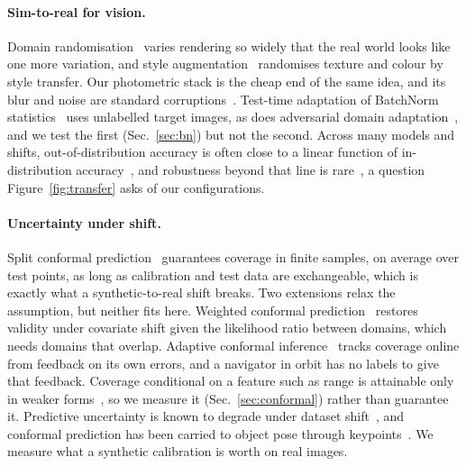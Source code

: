\documentclass{article}
\begin{document}
\paragraph{Sim-to-real for vision.} Domain
randomisation~\citep{tobin2017domainrand,tremblay2018training} varies rendering so widely that
the real world looks like one more variation, and style augmentation~\citep{jackson2019style}
randomises texture and colour by style transfer. Our photometric stack is the cheap end of
the same idea, and its blur and noise are standard corruptions~\citep{hendrycks2019benchmarking}.
Test-time adaptation of BatchNorm
statistics~\citep{li2018adabn,schneider2020improving,nado2020evaluating} uses unlabelled
target images, as does adversarial domain adaptation~\citep{ganin2016domain}, and we test the
first (Sec.~\ref{sec:bn}) but not the second. Across many models and shifts, out-of-distribution
accuracy is often close to a linear function of in-distribution
accuracy~\citep{miller2021accuracy}, and robustness beyond that line is
rare~\citep{taori2020measuring}, a question Figure~\ref{fig:transfer} asks of our
configurations.

\paragraph{Uncertainty under shift.} Split conformal
prediction~\citep{vovk2005algorithmic,lei2018distribution,angelopoulos2023gentle} guarantees
coverage in finite samples, on average over test points, as long as calibration and test data
are exchangeable, which is exactly what a synthetic-to-real shift breaks. Two extensions relax
the assumption, but neither fits here. Weighted conformal prediction~\citep{tibshirani2019covariate}
restores validity under covariate shift given the likelihood ratio between domains, which
needs domains that overlap. Adaptive conformal inference~\citep{gibbs2021adaptive} tracks
coverage online from feedback on its own errors, and a navigator in orbit has no labels to
give that feedback. Coverage conditional on a feature such as range is attainable only in
weaker forms~\citep{vovk2012conditional,barber2021limits}, so we measure it
(Sec.~\ref{sec:conformal}) rather than guarantee it. Predictive uncertainty is known to
degrade under dataset shift~\citep{ovadia2019trust}, and conformal prediction has been carried
to object pose through keypoints~\citep{yang2023object}. We measure what a synthetic
calibration is worth on real images.

\end{document}
